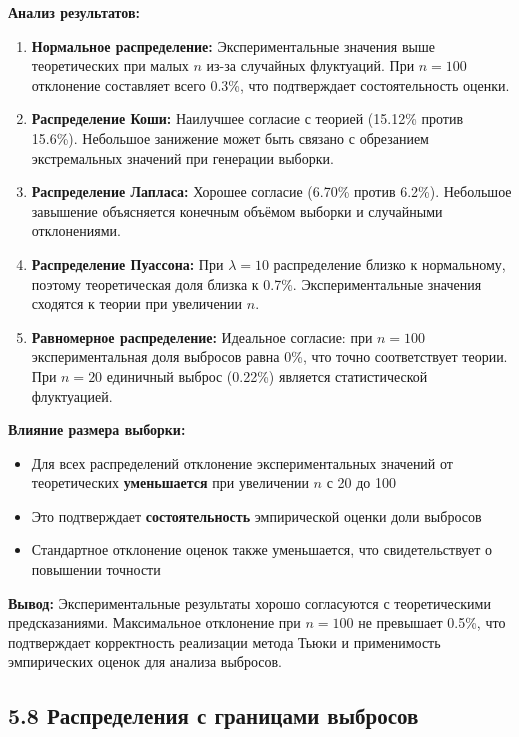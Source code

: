 \documentclass[a4paper,14pt]{extarticle}
\begin{document}
\textbf{Анализ результатов:}

\begin{enumerate}
    \item \textbf{Нормальное распределение:} Экспериментальные значения выше теоретических при малых $n$ из-за случайных флуктуаций. При $n=100$ отклонение составляет всего 0.3\%, что подтверждает состоятельность оценки.
    
    \item \textbf{Распределение Коши:} Наилучшее согласие с теорией (15.12\% против 15.6\%). Небольшое занижение может быть связано с обрезанием экстремальных значений при генерации выборки.
    
    \item \textbf{Распределение Лапласа:} Хорошее согласие (6.70\% против 6.2\%). Небольшое завышение объясняется конечным объёмом выборки и случайными отклонениями.
    
    \item \textbf{Распределение Пуассона:} При $\lambda=10$ распределение близко к нормальному, поэтому теоретическая доля близка к 0.7\%. Экспериментальные значения сходятся к теории при увеличении $n$.
    
    \item \textbf{Равномерное распределение:} Идеальное согласие: при $n=100$ экспериментальная доля выбросов равна 0\%, что точно соответствует теории. При $n=20$ единичный выброс (0.22\%) является статистической флуктуацией.
\end{enumerate}

\textbf{Влияние размера выборки:}

\begin{itemize}
    \item Для всех распределений отклонение экспериментальных значений от теоретических \textbf{уменьшается} при увеличении $n$ с 20 до 100
    \item Это подтверждает \textbf{состоятельность} эмпирической оценки доли выбросов
    \item Стандартное отклонение оценок также уменьшается, что свидетельствует о повышении точности
\end{itemize}

\textbf{Вывод:} Экспериментальные результаты хорошо согласуются с теоретическими предсказаниями. Максимальное отклонение при $n=100$ не превышает 0.5\%, что подтверждает корректность реализации метода Тьюки и применимость эмпирических оценок для анализа выбросов.

\subsection*{5.8 Распределения с границами выбросов}
\end{document}
